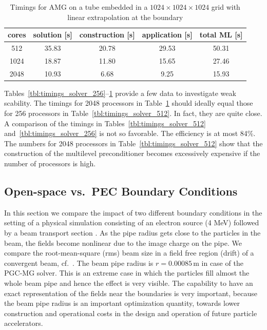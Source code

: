 \documentclass[a4paper,10pt,3p,preprint,pdftex]{elsarticle}
\begin{document}
\begin{table}[htb]
  \begin{center}
    \begin{tabular}{ccccc}
      \hline
      cores & solution [s] & construction [s] & application [s] & total ML [s] \\
      \hline
      512  &  35.83 &  20.78 &  29.53 &  50.31  \\
      1024 &  18.87 &  11.80 &  15.65 &  27.46  \\
      2048 &  10.93 &  6.68 &  9.25 &  15.93   \\
      \hline
    \end{tabular}
    \caption{Timings for AMG on a tube embedded in a
      $1024\times1024\times1024$ grid with linear extrapolation at the
      boundary}
    \label{tbl:timings_solver_1024}
  \end{center}
\end{table}
Tables~\ref{tbl:timings_solver_256}--\ref{tbl:timings_solver_1024}
provide a few data to investigate weak scability.  The timings for 2048
processors in Table~\ref{tbl:timings_solver_1024} should ideally equal
those for 256 processors in Table~\ref{tbl:timings_solver_512}.  In
fact, they are quite close.  A comparison of the timings in
Tables~\ref{tbl:timings_solver_512} and~\ref{tbl:timings_solver_256} is
not so favorable.  The efficiency is at most 84\%.  The numbers for 2048
processors in Table~\ref{tbl:timings_solver_512} show that the
construction of the multilevel preconditioner becomes excessively
expensive if the number of processors is high.

\subsection{Open-space vs.\ PEC Boundary Conditions} 
\label{sec:physrun}

In this section we compare the impact of two different boundary
conditions in the setting of a physical simulation consisting of an
electron source (4 MeV) followed by a beam transport section
\cite{schiet:08}.  As the pipe radius gets close to the particles in the
beam, the fields become nonlinear due to the image charge on the pipe.
We compare the root-mean-square (rms) beam size in a field free region
(drift) of a convergent beam, cf.~\cite[pp.171ff]{wied:07}.  The
beam pipe radius is $r = 0.00085$\,m in case of the PGC-MG solver.  This
is an extreme case in which the particles fill almost the whole beam
pipe and hence the effect is very visible. 
The capability to have an exact representation of
the fields near the boundaries is very important, because the beam pipe radius is an important optimization quantity,
towards lower construction and operational costs in the design and operation of future particle accelerators. 
\end{document}
